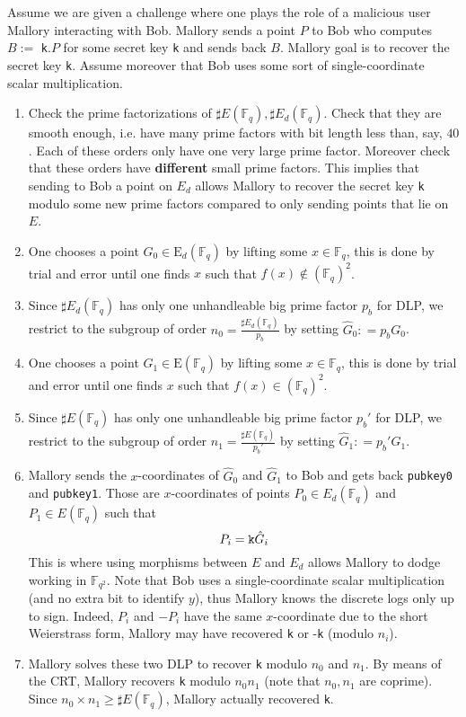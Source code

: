 \documentclass[10pt]{article}
\theoremstyle{definition}
\newcommand{\F}{\mathbb{F}}
\newcommand{\E}{\textrm{E}}
\begin{document}
\noindent Assume we are given a challenge where one plays the role of a malicious user Mallory interacting with Bob.
Mallory sends a point $P$ to Bob who computes $B := $ \verb|k|$.P$ for some secret key \verb|k| and sends back $B$.
Mallory goal is to recover the secret key \verb|k|.
Assume moreover that Bob uses some sort of single-coordinate scalar multiplication.

\begin{enumerate}
\item Check the prime factorizations of $\sharp{}E(\F_q), \sharp{}E_d(\F_q)$.
Check that they are smooth enough, i.e. have many prime factors with bit length less than, say, $40$.
Each of these orders only have one very large prime factor.
Moreover check that these orders have \textbf{different} small prime factors.
This implies that sending to Bob a point on $E_d$ allows Mallory to recover the secret key \verb|k| modulo some new prime factors compared to only sending points that lie on $E$.
\item One chooses a point $G_0 \in \E_d(\F_q)$ by lifting some $x\in \F_q$, this is done by trial and error until one finds $x$ such that $f(x) \notin (\F_q)^2$. 
\item Since $\sharp{}E_d(\F_q)$ has only one unhandleable big prime factor $p_b$ for DLP, we restrict to the subgroup of order $n_0 = \frac{\sharp{}E_d(\F_q)}{p_b}$ by setting $\hat{G}_0 : = p_b G_0$.
\item One chooses a point $G_1 \in \E(\F_q)$ by lifting some $x\in \F_q$, this is done by trial and error until one finds $x$ such that $f(x) \in (\F_q)^2$. 
\item Since $\sharp{}E(\F_q)$ has only one unhandleable big prime factor $p_b'$ for DLP, we restrict to the subgroup of order $n_1 = \frac{\sharp{}E(\F_q)}{p_b'}$ by setting $\hat{G}_1 : = p_b' G_1$.
\item Mallory sends the $x$-coordinates of $\hat{G}_0$ and $\hat{G}_1$ to Bob and gets back \verb|pubkey0| and \verb|pubkey1|.
Those are $x$-coordinates of points $P_0 \in E_d(\F_q)$ and $P_1 \in E(\F_q)$ such that 
\[ P_i = \verb|k|\hat{G}_i \]
This is where using morphisms between $E$ and $E_d$ allows Mallory to dodge working in $\F_{q^2}$.
Note that Bob uses a single-coordinate scalar multiplication (and no extra bit to identify $y$), thus Mallory knows the discrete logs only up to sign. 
Indeed, $P_i$ and $-P_i$ have the same $x$-coordinate due to the short Weierstrass form, Mallory may have recovered \verb|k| or -\verb|k| (modulo $n_i$).
\item Mallory solves these two DLP to recover \verb|k| modulo $n_0$  and $n_1$.
By means of the CRT, Mallory recovers \verb|k| modulo $n_0n_1$ (note that $n_0, n_1$ are coprime).
Since $n_0 \times n_1 \geq \sharp{}E(\F_q)$, Mallory  actually recovered \verb|k|.


\end{enumerate}
\end{document}
